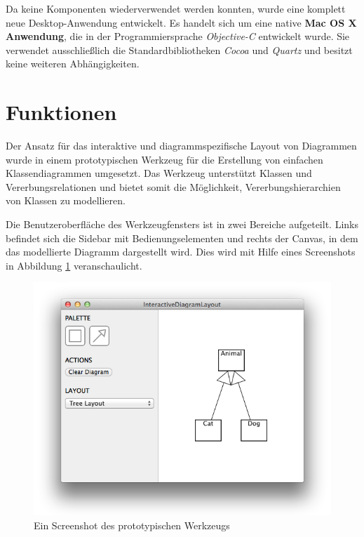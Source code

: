 Da keine Komponenten wiederverwendet werden konnten, wurde eine komplett neue Desktop-Anwendung entwickelt. Es handelt sich um eine native \textbf{Mac OS X Anwendung}, die in der Programmiersprache \textit{Objective-C} entwickelt wurde. Sie verwendet ausschließlich die Standardbibliotheken \textit{Cocoa} und \textit{Quartz} und besitzt keine weiteren Abhängigkeiten.

\section{Funktionen}
\label{sec:functions}

Der Ansatz für das interaktive und diagrammspezifische Layout von Diagrammen wurde in einem prototypischen Werkzeug für die Erstellung von einfachen Klassendiagrammen umgesetzt. Das Werkzeug unterstützt Klassen und Vererbungsrelationen und bietet somit die Möglichkeit, Vererbungshierarchien von Klassen zu modellieren.

Die Benutzeroberfläche des Werkzeugfensters ist in zwei Bereiche aufgeteilt. Links befindet sich die Sidebar mit Bedienungselementen und rechts der Canvas, in dem das modellierte Diagramm dargestellt wird. Dies wird mit Hilfe eines Screenshots in Abbildung \ref{fig:prototype-screenshot} veranschaulicht.

\begin{figure}[hbt]
    \centering
    \includegraphics[scale=0.6]{resources/prototype-screenshot}
    \caption{Ein Screenshot des prototypischen Werkzeugs}
    \label{fig:prototype-screenshot}
\end{figure}

